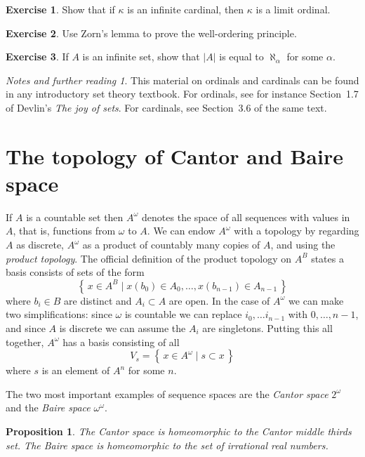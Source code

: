 \documentclass[11pt,oneside,a4paper]{amsbook}
\newcommand{\set}[1]{\left\{\,#1\,\right\}}
\theoremstyle{definition}
\newtheorem{exercise}{Exercise}[section]
\theoremstyle{plain}
\newtheorem{proposition}[theorem]{Proposition}
\theoremstyle{definition}
\theoremstyle{remark}
\newtheorem*{notes}{Notes and further reading}
\numberwithin{equation}{section}
\numberwithin{figure}{section}
\begin{document}
\begin{exercise}
  Show that if $\kappa$ is an infinite cardinal, then $\kappa$ is a limit ordinal.
\end{exercise}

\begin{exercise}
  Use Zorn's lemma to prove the well-ordering principle.
\end{exercise}

\begin{exercise}
  If $A$ is an infinite set, show that $|A|$ is equal to $\aleph_\alpha$ for some $\alpha$.
\end{exercise}

\begin{notes}
  This material on ordinals and cardinals can be found in any introductory set theory textbook. For ordinals, see for instance Section~1.7 of Devlin's \emph{The joy of sets}. For cardinals, see Section~3.6 of the same text.
\end{notes}


\newpage
\section{The topology of Cantor and Baire space}

If $A$ is a countable set then $A^\omega$ denotes the space of all sequences with values in $A$, that is, functions from $\omega$ to $A$. We can endow $A^\omega$ with a topology by regarding $A$ as discrete, $A^\omega$ as a product of countably many copies of $A$, and using the \emph{product topology}. The official definition of the product topology on $A^B$ states a basis consists of sets of the form
\[\set{x\in A^B\mid x(b_0)\in A_0,\ldots,x(b_{n-1})\in A_{n-1}}
\]
where $b_i\in B$ are distinct and $A_i\subset A$ are open. In the case of $A^\omega$ we can make two simplifications: since $\omega$ is countable we can replace $i_0,\ldots i_{n-1}$ with $0,\ldots,n-1$, and since $A$ is discrete we can assume the $A_i$ are singletons. Putting this all together, $A^\omega$ has a basis consisting of all
\[V_s=\set{x\in A^\omega\mid s\subset x}
\]
where $s$ is an element of $A^n$ for some $n$.

The two most important examples of sequence spaces are the \emph{Cantor space} $2^\omega$ and the \emph{Baire space} $\omega^\omega$.

\begin{proposition}
  \label{prop:cantor-baire-homeo}
  The Cantor space is homeomorphic to the Cantor middle thirds set. The Baire space is homeomorphic to the set of irrational real numbers.
\end{proposition}
\end{document}
